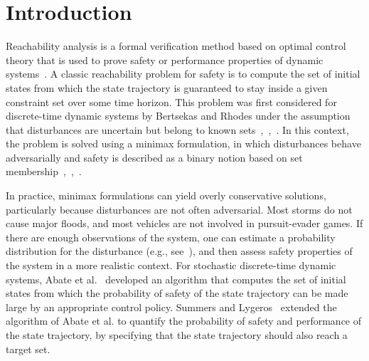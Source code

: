 \documentclass[letterpaper, 10 pt, conference]{ieeeconf}  %
\begin{document}

\section{Introduction}
\label{sec:introduction}
Reachability analysis is a formal verification method based on optimal control theory that is used to prove 
safety or performance properties of dynamic systems~\cite{bansal2017hamilton}.
A classic reachability problem for safety is to compute the set of initial states from which 
the state trajectory is guaranteed to stay inside a given constraint set over some time horizon.
This problem was first considered for discrete-time dynamic systems by Bertsekas and Rhodes 
under the assumption that disturbances are uncertain but belong to known sets~\cite{bertsekas1971control},~\cite{bertsekas1971minimax},~\cite{bertsekas2005dynamic}.
In this context, the problem is solved using a minimax formulation,
in which disturbances behave adversarially and safety is described as a binary notion based on set membership~\cite{bertsekas1971control},~\cite{bertsekas1971minimax},~\cite[Sec. 3.6.2]{bertsekas2005dynamic}.

In practice, minimax formulations can yield overly conservative solutions, particularly because disturbances are not often adversarial.
Most storms do not cause major floods, and most vehicles are not involved in pursuit-evader games.
If there are enough observations of the system, one can estimate a probability distribution
for the disturbance (e.g., see~\cite{silverman2018density}), and then assess safety properties of the system in a more realistic context.
For stochastic discrete-time dynamic systems, %
Abate et al.~\cite{abate2008probabilistic} developed an algorithm that computes the set of initial states
from which the probability of safety of the state trajectory can be made large by an appropriate control policy.\footnotemark
{} 
Summers and Lygeros~\cite{summers2010verification} extended the algorithm of Abate et al. to quantify the probability of safety and performance
of the state trajectory, by specifying that the state trajectory should also reach a target set.   
\end{document}
